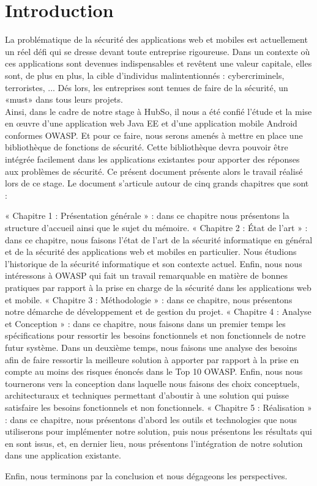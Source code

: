 
\chapter*{Introduction}

La problématique de la sécurité des applications web et mobiles est actuellement un réel défi qui se dresse devant toute entreprise rigoureuse. Dans un contexte où ces applications sont devenues indispensables et revêtent une valeur capitale, elles sont, de plus en plus, la cible d'individus malintentionnés : cybercriminels, terroristes, ... Dés lors, les entreprises sont tenues de faire de la sécurité, un «must» dans tous leurs projets.\\
Ainsi, dans le cadre de notre stage à HubSo, il nous a été confié l'étude et la mise en œuvre d'une application web Java EE et d'une application mobile Android conformes OWASP. Et pour ce faire, nous serons amenés à mettre en place une bibliothèque de fonctions de sécurité. Cette bibliothèque devra pouvoir être intégrée facilement dans les applications existantes pour apporter des réponses aux problèmes de sécurité.
Ce présent document présente alors le travail réalisé lors de ce stage.
Le document s’articule autour de cinq grands chapitres que sont :
\begin{itemize}
	\itemcheck « Chapitre 1 : Présentation générale » : dans ce chapitre nous présentons la structure d’accueil ainsi que le sujet du mémoire.
	\itemcheck « Chapitre 2 : État de l’art » : dans ce chapitre, nous faisons
	l’état de l’art de la sécurité informatique en général et de la sécurité des applications web et mobiles en particulier. Nous étudions l'historique de la sécurité informatique et son contexte actuel. Enfin, nous nous intéressons à OWASP qui fait un travail remarquable en matière de bonnes pratiques par rapport à la prise en charge de la sécurité dans les applications web et mobile.
	\itemcheck « Chapitre 3 : Méthodologie » : dans ce chapitre, nous présentons notre
	démarche de développement et de gestion du projet.
	\itemcheck « Chapitre 4 : Analyse et Conception » : dans ce chapitre, nous faisons dans un premier temps les spécifications pour ressortir les besoins fonctionnels et non fonctionnels de notre futur système. Dans un deuxième temps, nous faisons une analyse des besoins afin de faire ressortir la meilleure solution à apporter par rapport à la prise en compte au moins des risques énoncés dans le Top 10 OWASP. Enfin, nous nous tournerons vers la conception dans laquelle nous faisons des choix conceptuels, architecturaux et techniques permettant d’aboutir à une solution qui puisse satisfaire les besoins fonctionnels et non fonctionnels.
	\itemcheck « Chapitre 5 : Réalisation » : dans ce chapitre, nous présentons d’abord les outils et technologies que nous utiliserons pour implémenter notre solution, puis nous présentons les résultats qui en sont issus, et, en dernier lieu, nous présentons l'intégration de notre solution dans une application existante.
\end{itemize}
Enfin, nous terminons par la conclusion et nous dégageons les perspectives.
\clearpage
